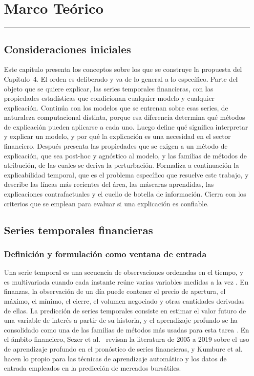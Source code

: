\chapter{Marco Teórico}
\hrule \bigskip \vspace*{1cm}
\label{chap:marco_teorico}

\section{Consideraciones iniciales}

Este capítulo presenta los conceptos sobre los que se construye la propuesta del Capítulo~4. El orden es deliberado y va de lo general a lo específico. Parte del objeto que se quiere explicar, las series temporales financieras, con las propiedades estadísticas que condicionan cualquier modelo y cualquier explicación. Continúa con los modelos que se entrenan sobre esas series, de naturaleza computacional distinta, porque esa diferencia determina qué métodos de explicación pueden aplicarse a cada uno. Luego define qué significa interpretar y explicar un modelo, y por qué la explicación es una necesidad en el sector financiero. Después presenta las propiedades que se exigen a un método de explicación, que sea post-hoc y agnóstico al modelo, y las familias de métodos de atribución, de las cuales se deriva la perturbación. Formaliza a continuación la explicabilidad temporal, que es el problema específico que resuelve este trabajo, y describe las líneas más recientes del área, las máscaras aprendidas, las explicaciones contrafactuales y el cuello de botella de información. Cierra con los criterios que se emplean para evaluar si una explicación es confiable.

\section{Series temporales financieras}
\label{sec:mt_series}

\subsection{Definición y formulación como ventana de entrada}
\label{sec:mt_ventana}

Una serie temporal es una secuencia de observaciones ordenadas en el tiempo, y es multivariada cuando cada instante reúne varias variables medidas a la vez \cite{tsay2010}. En finanzas, la observación de un día puede contener el precio de apertura, el máximo, el mínimo, el cierre, el volumen negociado y otras cantidades derivadas de ellas. La predicción de series temporales consiste en estimar el valor futuro de una variable de interés a partir de su historia, y el aprendizaje profundo se ha consolidado como una de las familias de métodos más usadas para esta tarea \cite{lim2021}. En el ámbito financiero, Sezer et al.\ \cite{sezer2020} revisan la literatura de 2005 a 2019 sobre el uso de aprendizaje profundo en el pronóstico de series financieras, y Kumbure et al.\ \cite{kumbure2022} hacen lo propio para las técnicas de aprendizaje automático y los datos de entrada empleados en la predicción de mercados bursátiles.

